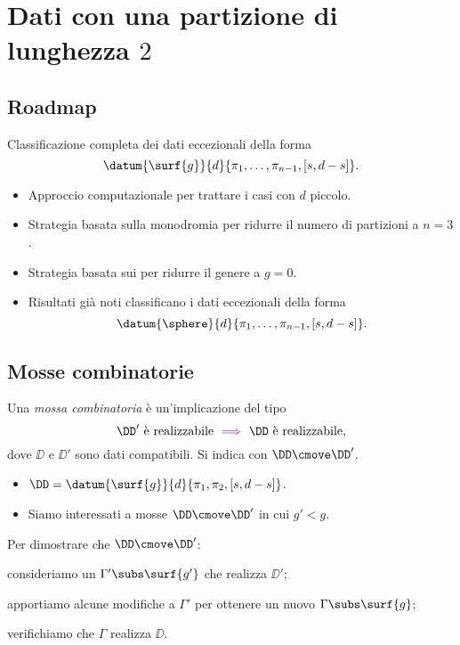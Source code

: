 \section{Dati con una partizione di lunghezza \texorpdfstring{$2$}{2}}

\subsection{Roadmap}
\begin{frame}
\begin{mybox}[title=Obiettivo]
Classificazione completa dei dati eccezionali della forma
\[
\datum{\surf{g}}{d}{\pi_1,\ldots,\pi_{n-1},[s,d-s]}.
\]
\end{mybox}
\begin{itemize}
\item Approccio computazionale per trattare i casi con $d$ piccolo.
\item Strategia basata sulla monodromia per ridurre il numero di partizioni a $n=3$.
\item Strategia basata sui \dessins{} per ridurre il genere a $g=0$.
\item Risultati già noti  classificano i dati eccezionali della forma
\[
\datum{\sphere}{d}{\pi_1,\ldots,\pi_{n-1},[s,d-s]}.
\]
\end{itemize}
\end{frame}

\subsection{Mosse combinatorie}
\begin{frame}
Una \emph{mossa combinatoria} è un'implicazione del tipo
\[
\text{$\DD'$ è realizzabile \textcolor{violet}{$\implies$} $\DD$ è realizzabile,}
\]
dove $\DD$ e $\DD'$ sono dati compatibili. Si indica con $\DD\cmove\DD'$.
\begin{itemize}
\item $\DD=\datum{\surf{g}}{d}{\pi_1,\pi_2,[s,d-s]}$.
\item Siamo interessati a mosse $\DD\cmove\DD'$ in cui $g'<g$.
\end{itemize}
\begin{mybox}[title=Schema dimostrativo]
Per dimostrare che $\DD\cmove\DD'$:
\begin{enumarabic}
\item consideriamo un \dessin{} $\Gamma'\subs\surf{g'}$ che realizza $\DD'$;
\item apportiamo alcune modifiche a $\Gamma'$ per ottenere un nuovo \dessin{} $\Gamma\subs\surf{g}$;
\item verifichiamo che $\Gamma$ realizza $\DD$.
\end{enumarabic}
\end{mybox}
\end{frame}

